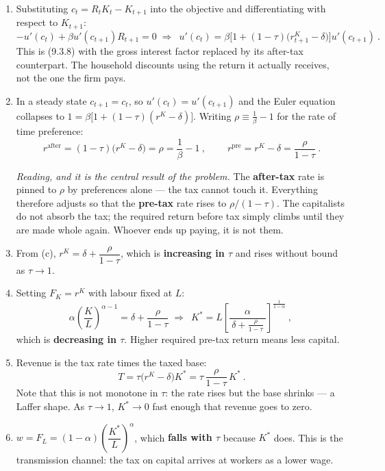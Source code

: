 \documentclass[12pt, letterpaper]{article}
\newcommand{\stst}{^{\ast}}
\begin{document}
\begin{tcolorbox}[evenbox,title={Problem 9.6 \quad Capital Income Taxes}]
\begin{enumerate}
\item Substituting $c_t=R_tK_t-K_{t+1}$ into the objective and differentiating with respect to
$K_{t+1}$:
\[
-u'(c_t)+\beta u'(c_{t+1})R_{t+1}=0
\;\Longrightarrow\;
\boxed{\ u'(c_t)=\beta\Big[1+(1-\tau)\big(r^K_{t+1}-\delta\big)\Big]u'(c_{t+1})\ }.
\]
This is (9.3.8) with the gross interest factor replaced by its after-tax counterpart. The
household discounts using the return it actually receives, not the one the firm pays.

\item In a steady state $c_{t+1}=c_t$, so $u'(c_t)=u'(c_{t+1})$ and the Euler equation collapses
to $1=\beta\big[1+(1-\tau)(r^K-\delta)\big]$. Writing $\rho\equiv\frac{1}{\beta}-1$ for the rate
of time preference:
\[
\boxed{\ r^{\text{after}}=(1-\tau)\big(r^K-\delta\big)=\rho=\frac{1}{\beta}-1\ },
\qquad
\boxed{\ r^{\text{pre}}=r^K-\delta=\frac{\rho}{1-\tau}\ }.
\]

\emph{Reading, and it is the central result of the problem.} The \textbf{after-tax} rate is
pinned to $\rho$ by preferences alone --- the tax cannot touch it. Everything therefore adjusts
so that the \textbf{pre-tax} rate rises to $\rho/(1-\tau)$. The capitalists do not absorb the
tax; the required return before tax simply climbs until they are made whole again. Whoever ends
up paying, it is not them.

\item From (c), $r^K=\delta+\dfrac{\rho}{1-\tau}$, which is \textbf{increasing in $\tau$} and
rises without bound as $\tau\to1$.

\item Setting $F_K=r^K$ with labour fixed at $L$:
\[
\alpha\left(\frac{K}{L}\right)^{\alpha-1}=\delta+\frac{\rho}{1-\tau}
\;\Longrightarrow\;
\boxed{\ K\stst=L\left[\frac{\alpha}{\ \delta+\frac{\rho}{1-\tau}\ }\right]^{\frac{1}{1-\alpha}}\ },
\]
which is \textbf{decreasing in $\tau$}. Higher required pre-tax return means less capital.

\item Revenue is the tax rate times the taxed base:
\[
\boxed{\ T=\tau\big(r^K-\delta\big)K\stst=\tau\,\frac{\rho}{1-\tau}\,K\stst\ }.
\]
Note that this is not monotone in $\tau$: the rate rises but the base shrinks --- a Laffer
shape. As $\tau\to1$, $K\stst\to0$ fast enough that revenue goes to zero.

\item $w=F_L=(1-\alpha)\left(\dfrac{K\stst}{L}\right)^{\alpha}$, which \textbf{falls with
$\tau$} because $K\stst$ does. This is the transmission channel: the tax on capital arrives at
workers as a lower wage.


\end{enumerate}
\end{tcolorbox}
\end{document}
